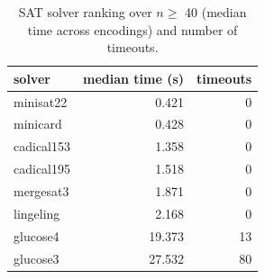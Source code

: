 \begin{table}[t]
\centering
\caption{SAT solver ranking over $n \geq$ 40 (median time across encodings) and number of timeouts.}
\label{tab:solver_rank}
\begin{tabular}{lrr}
\toprule
solver & median time (s) & timeouts \\
\midrule
minisat22 & 0.421 & 0 \\
minicard & 0.428 & 0 \\
cadical153 & 1.358 & 0 \\
cadical195 & 1.518 & 0 \\
mergesat3 & 1.871 & 0 \\
lingeling & 2.168 & 0 \\
glucose4 & 19.373 & 13 \\
glucose3 & 27.532 & 80 \\
\bottomrule
\end{tabular}
\end{table}
